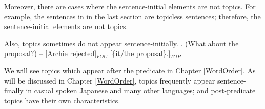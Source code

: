 Moreover, there are cases where the sentence-initial elements are not topics.
For example, the sentences in \LLast in the last section are topicless sentences;
therefore, the sentence-initial elements are not topics.

Also, topics sometimes do not appear sentence-initially.
%
\ex. (What about the proposal?) -- [Archie rejected]$_{FOC}$ [\{it/the proposal\}.]$_{TOP}$

We will see
topics which appear after the predicate
in Chapter \ref{WordOrder}.
As will be discussed in Chapter \ref{WordOrder},
topics frequently appear sentence-finally in casual spoken Japanese and many other languages;
and post-predicate topics have their own characteristics.

%

%
%
%

